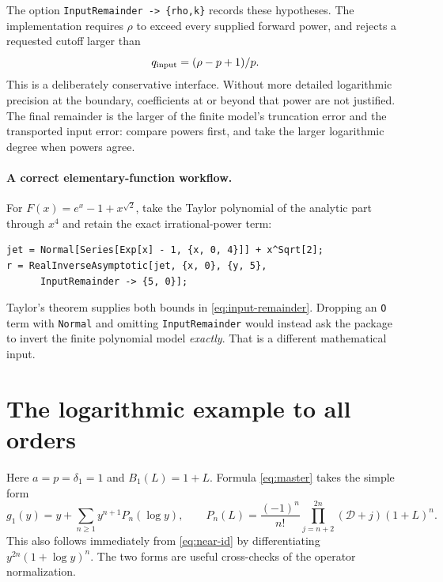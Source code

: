 \documentclass[11pt,a4paper]{article}
\numberwithin{equation}{section}
\theoremstyle{definition}
\theoremstyle{remark}
\newcommand{\D}{\mathcal D}
\begin{document}
The option \texttt{InputRemainder -> \{rho,k\}} records these hypotheses.
The implementation requires $\rho$ to exceed every supplied forward power,
and rejects a requested cutoff larger than
\begin{equation}
 q_{\rm input}=(\rho-p+1)/p.
 \label{eq:input-cap}
\end{equation}
This is a deliberately conservative interface. Without more detailed
logarithmic precision at the boundary, coefficients at or beyond that
power are not justified. The final remainder is the larger of the finite
model's truncation error and the transported input error: compare powers
first, and take the larger logarithmic degree when powers agree.

\paragraph{A correct elementary-function workflow.}
For $F(x)=e^x-1+x^{\sqrt2}$, take the Taylor polynomial of the analytic part
through $x^4$ and retain the exact irrational-power term:
\begin{lstlisting}
jet = Normal[Series[Exp[x] - 1, {x, 0, 4}]] + x^Sqrt[2];
r = RealInverseAsymptotic[jet, {x, 0}, {y, 5},
      InputRemainder -> {5, 0}];
\end{lstlisting}
Taylor's theorem supplies both bounds in \eqref{eq:input-remainder}.
Dropping an \texttt{O} term with \texttt{Normal} and omitting
\texttt{InputRemainder} would instead ask the package to invert the finite
polynomial model \emph{exactly}. That is a different mathematical input.

\section{The logarithmic example to all orders}
\label{sec:logexample}

Here $a=p=\delta_1=1$ and $B_1(L)=1+L$. Formula
\eqref{eq:master} takes the simple form
\begin{equation}
 g_1(y)=y+\sum_{n\ge1}y^{n+1}P_n(\log y),\qquad
 P_n(L)=\frac{(-1)^n}{n!}
          \prod_{j=n+2}^{2n}(\D+j)(1+L)^n.
 \label{eq:log-all-orders}
\end{equation}
This also follows immediately from \eqref{eq:near-id} by differentiating
$y^{2n}(1+\log y)^n$. The two forms are useful cross-checks of the operator
normalization.
\end{document}
